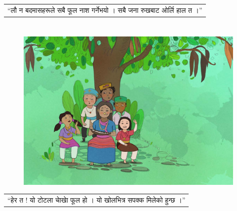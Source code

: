 \documentclass[
  letterpaper,
  DIV=11,
  numbers=noendperiod,
  paper=6in:9in,
  pagesize=pdftex,
  headinclude=on,
  footinclude=on,
  12pt]{scrreprt}
\begin{document}
\begin{longtable}[]{@{}l@{}}
\toprule\noalign{}
\endhead
\bottomrule\noalign{}
\endlastfoot
``लौ न बदमासहरूले सबै फूल नाश गर्नेभयो । सबै जना रुखबाट ओर्लि हाल त ।'' \\
\end{longtable}


\hypertarget{section-2}{%
\chapter{}\label{section-2}}

\begin{figure}[H]

{\centering \includegraphics{images/p-4.jpg}

}

\end{figure}

\begin{longtable}[]{@{}l@{}}
\toprule\noalign{}
\endhead
\bottomrule\noalign{}
\endlastfoot
``हेर त ! यो टोटला चाेखाे फूल हो । यो खोलभित्र सपक्क मिलेको हुन्छ ।'' \\
\end{longtable}


\hypertarget{section-3}{%
\chapter{}\label{section-3}}
\end{document}
